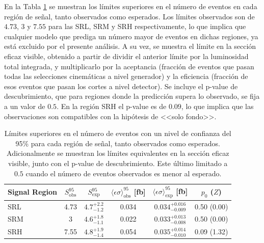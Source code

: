 En la Tabla \ref{tab:model_indep_ul} se muestran los límites superiores en el número de eventos en cada región de señal, tanto observados como esperados. Los límites observados son de $4.73$, $3$ y $7.55$ para las SRL, SRM y SRH respectivamente, lo que implica que cualquier modelo que prediga un número mayor de eventos en dichas regiones, ya está excluido por el presente análisis. A su vez, se muestra el límite en la sección eficaz visible, obtenido a partir de dividir el anterior límite por la luminosidad total integrada, y multiplicarlo por la aceptancia (fracción de eventos que pasan todas las selecciones cinemáticas a nivel generador) y la eficiencia (fracción de esos eventos que pasan los cortes a nivel detector). 
Se incluye el p-value de descubrimiento, que para regiones donde la predicción supera lo observado, se fija a un valor de $0.5$. En la región SRH el p-value es de $0.09$, lo que implica que las observaciones son compatibles con la hipótesis de <<solo fondo>>.


\begin{table}[!ht]
  \centering
  \caption{Límites superiores en el número de eventos con un nivel de confianza del 95\% para cada región de señal, tanto observados como esperados. Adicionalmente se muestran los límites equivalentes en la sección eficaz visible, junto con el p-value de descubrimiento. Este último limitado a $0.5$ cuando el número de eventos observados es menor al esperado.}

    \begin{tabular}{lccccc}
      \hline
      \hline
      Signal Region  & $S_{\mathrm{obs}}^{95}$  & $S_{\mathrm{exp}}^{95}$ & $\langle\epsilon{\sigma}\rangle_{\mathrm{obs}}^{95}$ [fb]  & $\langle\epsilon{\sigma}\rangle_{\mathrm{exp}}^{95}$ [fb] & $p_{0}$ ($Z$)\\
      \hline
      \hline
      SRL     &   4.73   &   $4.7^{+2.2}_{-1.2}$ &  0.034   &   $0.034^{+0.016}_{-0.009}$    &    0.50 (0.00)  \\ 
      SRM    &   3       &   $4.6^{+1.8}_{-1.1}$ &  0.022   &   $0.033^{+0.013}_{-0.008}$     &    0.50 (0.00)  \\ 
      SRH     &   7.55   &   $4.8^{+1.9}_{-1.4}$ &  0.054   &   $0.035^{+0.014}_{-0.010}$    &    0.09 (1.32)  \\
      \hline
      \hline
    \end{tabular}
    \label{tab:model_indep_ul}
  \end{table}



